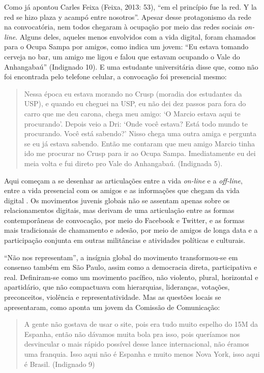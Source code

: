 Como já apontou Carles Feixa (Feixa, 2013: 53), ``em el princípio fue la
red. Y la red se hizo plaza y acampó entre nosotros''. Apesar desse
protagonismo da rede na convocatória, nem todos chegaram à ocupação por
meio das redes sociais \emph{on-line}. Alguns deles, aqueles menos
envolvidos com a vida digital, foram chamados para o Ocupa Sampa por
amigos, como indica um jovem: ``Eu estava tomando cerveja no bar, um
amigo me ligou e falou que estavam ocupando o Vale do Anhangabaú''
(Indignado 10). E uma estudante universitária disse que, como não foi
encontrada pelo telefone celular, a convocação foi presencial mesmo:

\begin{quote}
Nessa época eu estava morando no Crusp (moradia dos estudantes da USP),
e quando eu cheguei na USP, eu não dei dez passos para fora do carro que
me deu carona, chega meu amigo: `O Marcio estava aqui te procurando'.
Depois veio a Dri: `Onde você estava? Está todo mundo te procurando.
Você está sabendo?' Nisso chega uma outra amiga e pergunta se eu já
estava sabendo. Então me contaram que meu amigo Marcio tinha ido me
procurar no Crusp para ir ao Ocupa Sampa. Imediatamente eu dei meia
volta e fui direto pro Vale do Anhangabaú. (Indignada 5).
\end{quote}

Aqui começam a se desenhar as articulações entre a vida \emph{on-line} e
a \emph{off-line}, entre a vida presencial com os amigos e as
informações que chegam da vida digital . Os movimentos juvenis globais
não se assentam apenas sobre os relacionamentos digitais, mas derivam de
uma articulação entre as formas contemporâneas de convocação, por meio
do Facebook e Twitter, e as formas mais tradicionais de chamamento e
adesão, por meio de amigos de longa data e a participação conjunta em
outras militâncias e atividades políticas e culturais.

``Não nos representam'', a insígnia global do movimento transformou-se
em consenso também em São Paulo, assim como a democracia direta,
participativa e real. Definiram-se como um movimento pacífico, não
violento, plural, horizontal e apartidário, que não compactuava com
hierarquias, lideranças, votações, preconceitos, violência e
representatividade. Mas as questões locais se apresentaram, como aponta
um jovem da Comissão de Comunicação:

\begin{quote}
A gente não gostava de usar o site, pois era tudo muito espelho do 15M
da Espanha, então não dávamos muita bola pra isso, pois queríamos nos
desvincular o mais rápido possível desse lance internacional, não éramos
uma franquia. Isso aqui não é Espanha e muito menos Nova York, isso aqui
é Brasil. (Indignado 9)
\end{quote}

